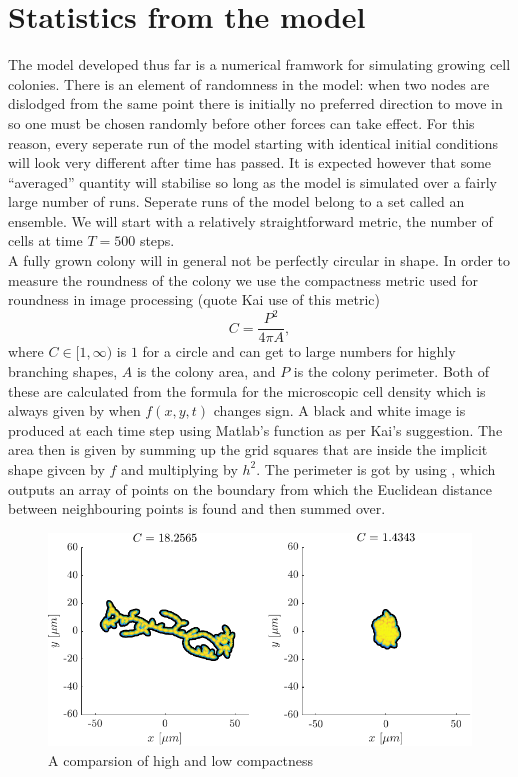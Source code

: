 \newpage





\section{Statistics from the model}
The model developed thus far is a numerical framwork for simulating growing cell colonies.
There is an element of randomness in the model: when two nodes are dislodged from the 
same point there is initially no preferred direction to move in so one must be chosen randomly
before other forces can take effect. For this reason, every seperate run of the model 
starting with identical initial conditions will look very different after time has passed. 
It is expected however that some ``averaged''
quantity will stabilise so long as the model is simulated over a fairly large number of runs.
Seperate runs of the model belong to a set called an ensemble.
We will start with a relatively straightforward metric, the number of cells at time
$T = 500$ steps.
\\

A fully grown colony will in general not be perfectly circular in shape.
 In order to measure the roundness of the colony we use the compactness metric used for 
 roundness in image processing (quote Kai use of this metric)
\begin{equation}
  C = \frac{P^2}{4 \pi A},
\end{equation}
where $C \in [1, \infty)$ is $1$ for a circle and can get to large numbers for 
highly branching shapes, $A$ is the colony area, and $P$ is the colony perimeter. 
Both of these are calculated from the formula for the microscopic cell
density which is always given by when $f(x,y,t)$ changes sign. A black and white image 
is produced at each time step using Matlab's function  as per
Kai's suggestion. The area then is given by summing up the grid squares that are
inside the implicit shape givcen by $f$ and multiplying by $h^2$. The perimeter
is got by using , which outputs an array of points on the boundary
from which the Euclidean distance between neighbouring points is found and then summed over.
\begin{figure}[!htb]
    \centering
    \includegraphics[width=\textwidth]{chapter1/figures/compareCompactness.pdf}
    \caption{A comparsion of high and low compactness}
    \label{fig:compatness_comparison}
\end{figure}

